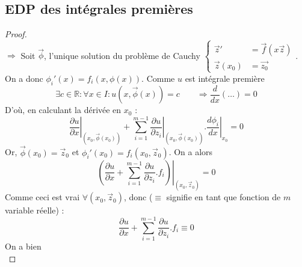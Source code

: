 	
	\setcounter{subsection}{4}
	\subsection{EDP des intégrales premières}

	\begin{proof}\ \\
	$\Longrightarrow$ Soit $\vec{\phi}$, l'unique solution du problème de
	Cauchy $\displaystyle\left\{\begin{array}{ll}
	\vec{z}' &= \vec{f}(x\vec{z})\\
	\vec{z}(x_0) &= \vec{z_0}
	\end{array}\right.$. On a donc $\phi_i'(x) = f_i(x,\phi(x))$.	Comme $u$ est 
	intégrale première
	\begin{equation}
	\exists c \in \mathbb{R} : \forall x \in I : u(x,\vec\phi(x)) = c\qquad
	\Longrightarrow \dfrac{d}{dx}(\dots) = 0
	\end{equation}
	D'où, en calculant la dérivée en $x_0$ :
	\begin{equation}
	\left.\dfrac{\partial u}{\partial x}\right|_{(x_0,\vec{\phi}(x_0))} + 
	\sum_{i=1}^{m-1}\left.\dfrac{\partial u}{\partial z_i}\right|_{(x_0,
	\vec{\phi}(x_0))}.\left.\dfrac{d\phi_i}{dx}\right|_{x_0} = 0
	\end{equation}
	Or, $\vec{\phi}(x_0) = \vec{z}_0$ et $\phi_i'(x_0)=f_i(x_0,\vec{z}_0)$. On 
	a alors
	\begin{equation}
	\left.\left(\dfrac{\partial u}{\partial x}+\sum_{i=1}^{m-1}\dfrac{\partial u
	}{\partial z_i}.f_i\right)\right|_{(x_0,\vec{z}_0)} = 0
	\end{equation}
	Comme ceci est vrai $\forall (x_0,\vec{z}_0)$, donc ($\equiv$ signifie 
	en tant que fonction de $m$ variable réelle) :
	\begin{equation}
	\dfrac{\partial u}{\partial x}+\sum_{i=1}^{m-1}\dfrac{\partial u
	}{\partial z_i}.f_i\equiv 0
	\end{equation}
	On a bien
	\begin{equation}

\end{equation}
\end{proof}
